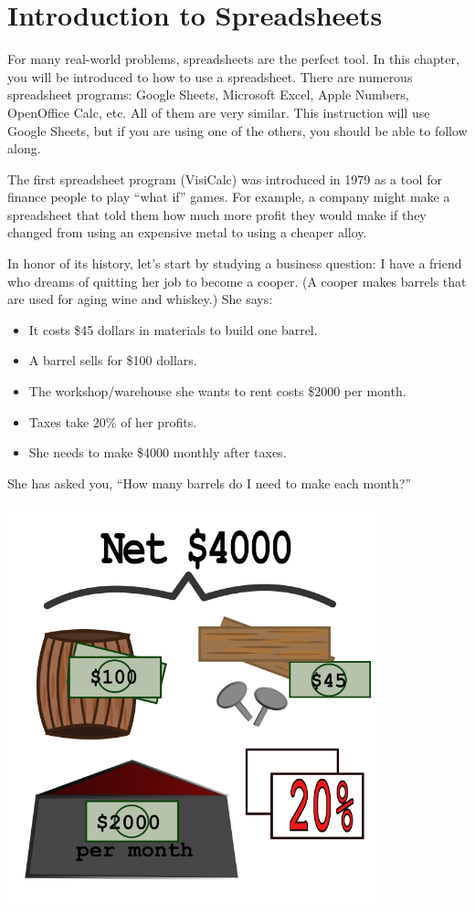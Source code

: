 \chapter{Introduction to Spreadsheets}

For many real-world problems, spreadsheets are the perfect
tool. In this chapter, you will be introduced to how to use a
spreadsheet. There are numerous spreadsheet programs: Google Sheets,
Microsoft Excel, Apple Numbers, OpenOffice Calc, etc.  All of them are
very similar. This instruction will use Google Sheets, but if you are using one
of the others, you should be able to follow along.

The first spreadsheet program (VisiCalc) was introduced in 1979 as a
tool for finance people to play ``what if'' games.  For example, a
company might make a spreadsheet that told them how much more profit
they would make if they changed from using an expensive metal to using
a cheaper alloy.

In honor of its history, let's start by studying a business question:
I have a friend who dreams of quitting her job to become a cooper. (A
cooper makes barrels that are used for aging wine and whiskey.)  She
says:
\begin{itemize}
\item It costs \$45 dollars in materials to build one barrel.
\item A barrel sells for \$100 dollars.
\item The workshop/warehouse she wants to rent costs \$2000 per month.
\item Taxes take 20\% of her profits.
\item She needs to make \$4000 monthly after taxes.
\end{itemize}

She has asked you, ``How many barrels do I need to make each month?''

\includegraphics[width=0.8\textwidth]{Barrel.png}

